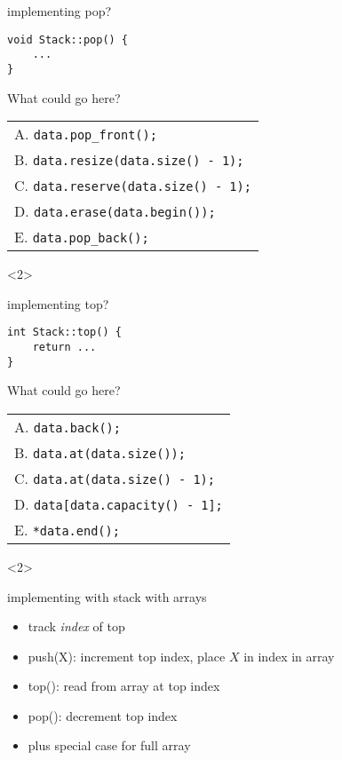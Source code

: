 \begin{frame}[fragile,label=vectorStackImplPop]{implementing pop?}
\lstset{language=C++,style=small}
\begin{lstlisting}
void Stack::pop() {
    ...
}
\end{lstlisting}
What could go here? \\
    \begin{tabular}{l}
        A. \lstinline|data.pop_front();| \\
        B. \lstinline|data.resize(data.size() - 1);| \\
        C. \lstinline|data.reserve(data.size() - 1);| \\
        D. \lstinline|data.erase(data.begin());| \\
        E. \lstinline|data.pop_back();| \\
    \end{tabular}
\begin{visibleenv}<2>
\iftoggle{heldback}{}{
\\
\myemph{B or E}
}
\end{visibleenv}
\end{frame}

\begin{frame}[fragile,label=vectorStackImplTop]{implementing top?}
\lstset{language=C++,style=small}
\begin{lstlisting}
int Stack::top() {
    return ...
}
\end{lstlisting}
What could go here? \\
    \begin{tabular}{l}
        A. \lstinline|data.back();| \\
        B. \lstinline|data.at(data.size());| \\
        C. \lstinline|data.at(data.size() - 1);|\\
        D. \lstinline|data[data.capacity() - 1];| \\
        E. \lstinline|*data.end();| \\
    \end{tabular}
\begin{visibleenv}<2>
\iftoggle{heldback}{}{
\\ \myemph{A or C} \\
 or \lstinline|data[data.size() - 1]| \\ or
    \lstinline|*(data.end() - 1);|
}
\end{visibleenv}
\end{frame}

\begin{frame}{implementing with stack with arrays}
    \begin{itemize}
    \item track \textit{index} of top
    \item push(X): increment top index, place $X$ in index in array
    \item top(): read from array at top index
    \item pop(): decrement top index
    \item plus special case for full array
    \end{itemize}
\end{frame}
